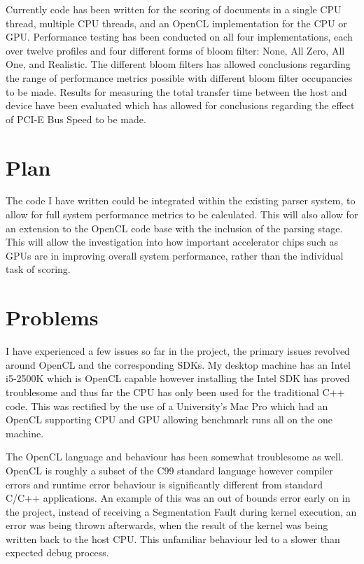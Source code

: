 \documentclass[11pt]{article}
\begin{document}
Currently code has been written for the scoring of documents in a single CPU
thread, multiple CPU threads, and an OpenCL implementation for the CPU or GPU.
Performance testing has been conducted on all four implementations, each over
twelve profiles and four different forms of bloom filter: None, All Zero, All
One, and Realistic. The different bloom filters has allowed conclusions
regarding the range of performance metrics possible with different bloom filter
occupancies to be made. Results for measuring the total transfer time between
the host and device have been evaluated which has allowed for conclusions
regarding the effect of PCI-E Bus Speed to be made.

\section*{Plan}

The code I have written could be integrated within the existing parser system,
to allow for full system performance metrics to be calculated. This will also
allow for an extension to the OpenCL code base with the inclusion of the
parsing stage. This will allow the investigation into how important accelerator
chips such as GPUs are in improving overall system performance, rather than the
individual task of scoring.

\section*{Problems}

I have experienced a few issues so far in the project, the primary issues
revolved around OpenCL and the corresponding SDKs. My desktop machine has an
Intel i5-2500K which is OpenCL capable however installing the Intel SDK has
proved troublesome and thus far the CPU has only been used for the traditional
C++ code. This was rectified by the use of a University's Mac Pro which had an
OpenCL supporting CPU and GPU allowing benchmark runs all on the one machine.

The OpenCL language and behaviour has been somewhat troublesome as well. OpenCL
is roughly a subset of the C99 standard language however compiler errors and
runtime error behaviour is significantly different from standard C/C++
applications. An example of this was an out of bounds error early on in the
project, instead of receiving a Segmentation Fault during kernel execution, an
error was being thrown afterwards, when the result of the kernel was being
written back to the host CPU. This unfamiliar behaviour led to a slower than
expected debug process.
\end{document}
